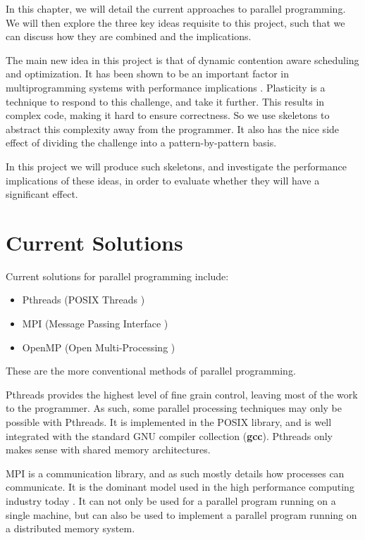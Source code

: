 
In this chapter, we will detail the current approaches to parallel programming. We will then explore the three key ideas requisite to this project, such that we can discuss how they are combined and the implications.

The main new idea in this project is that of dynamic contention aware scheduling and optimization. It has been shown to be an important factor in multiprogramming systems with performance implications \cite{lira}. Plasticity is a technique to respond to this challenge, and take it further. This results in complex code, making it hard to ensure correctness. So we use skeletons to abstract this complexity away from the programmer. It also has the nice side effect of dividing the challenge into a pattern-by-pattern basis.

In this project we will produce such skeletons, and investigate the performance implications of these ideas, in order to evaluate whether they will have a significant effect.



\section{Current Solutions}

Current solutions for parallel programming include:

\begin{itemize}
	\item Pthreads (POSIX Threads \cite{posix_threads})
	\item MPI 	   (Message Passing Interface \cite{mpi})
	\item OpenMP   (Open Multi-Processing \cite{openmp_home} \cite{openmp})
\end{itemize}

These are the more conventional methods of parallel programming.

Pthreads provides the highest level of fine grain control, leaving most of the work to the programmer. As such, some parallel processing techniques may only be possible with Pthreads. It is implemented in the POSIX library, and is well integrated with the standard GNU compiler collection (\textbf{gcc}). Pthreads only makes sense with shared memory architectures.

MPI is a communication library, and as such mostly details how processes can communicate. It is the dominant model used in the high performance computing industry today \cite{mpi}. It can not only be used for a parallel program running on a single machine, but can also be used to implement a parallel program running on a distributed memory system.

